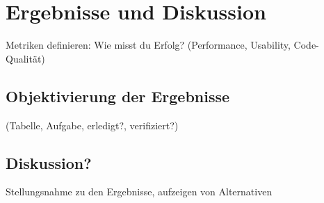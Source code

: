 \chapter{Ergebnisse und Diskussion}
Metriken definieren: Wie misst du Erfolg? (Performance, Usability, Code-Qualität)

\section{Objektivierung der Ergebnisse}
(Tabelle, Aufgabe, erledigt?, verifiziert?)

\section{Diskussion?}
Stellungsnahme zu den Ergebnisse, aufzeigen von Alternativen
